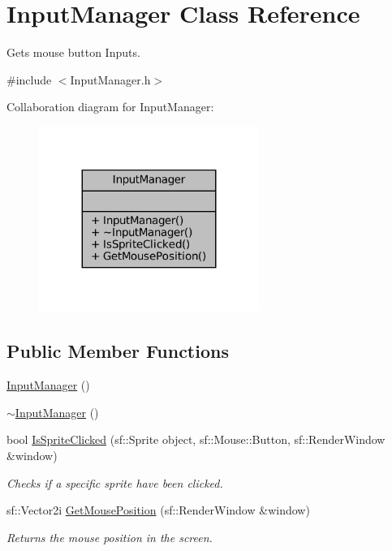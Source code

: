 \hypertarget{classInputManager}{}\section{Input\+Manager Class Reference}
\label{classInputManager}


Gets mouse button Inputs.  




{\ttfamily \#include $<$Input\+Manager.\+h$>$}



Collaboration diagram for Input\+Manager\+:\nopagebreak
\begin{figure}[H]
\begin{center}
\leavevmode
\includegraphics[width=203pt]{classInputManager__coll__graph}
\end{center}
\end{figure}
\subsection*{Public Member Functions}
\begin{DoxyCompactItemize}
\item 
\mbox{\hyperlink{classInputManager_a8be46886da639b26d67181c29dab6d6c}{Input\+Manager}} ()
\item 
\mbox{\hyperlink{classInputManager_af518290877dd183606709d5852db5491}{$\sim$\+Input\+Manager}} ()
\item 
bool \mbox{\hyperlink{classInputManager_a39886282f4c7871f3892f6ed16a545d3}{Is\+Sprite\+Clicked}} (sf\+::\+Sprite object, sf\+::\+Mouse\+::\+Button, sf\+::\+Render\+Window \&window)
\begin{DoxyCompactList}\small\item\em Checks if a specific sprite have been clicked. \end{DoxyCompactList}\item 
sf\+::\+Vector2i \mbox{\hyperlink{classInputManager_a4c9492c2d988fae3b5f5e21eab7ba72d}{Get\+Mouse\+Position}} (sf\+::\+Render\+Window \&window)
\begin{DoxyCompactList}\small\item\em Returns the mouse position in the screen. \end{DoxyCompactList}\end{DoxyCompactItemize}



